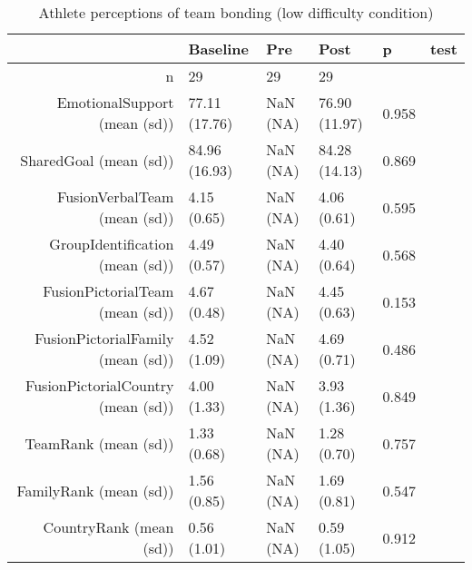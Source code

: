 \begin{table}[ht]
\centering
\begin{tabular}{rlllll}
  \hline
 & Baseline & Pre & Post & p & test \\ 
  \hline
n &    29 &  29 &    29 &  &  \\ 
  EmotionalSupport (mean (sd)) & 77.11 (17.76) & NaN (NA) & 76.90 (11.97) &  0.958 &  \\ 
  SharedGoal (mean (sd)) & 84.96 (16.93) & NaN (NA) & 84.28 (14.13) &  0.869 &  \\ 
  FusionVerbalTeam (mean (sd)) &  4.15 (0.65) & NaN (NA) &  4.06 (0.61) &  0.595 &  \\ 
  GroupIdentification (mean (sd)) &  4.49 (0.57) & NaN (NA) &  4.40 (0.64) &  0.568 &  \\ 
  FusionPictorialTeam (mean (sd)) &  4.67 (0.48) & NaN (NA) &  4.45 (0.63) &  0.153 &  \\ 
  FusionPictorialFamily (mean (sd)) &  4.52 (1.09) & NaN (NA) &  4.69 (0.71) &  0.486 &  \\ 
  FusionPictorialCountry (mean (sd)) &  4.00 (1.33) & NaN (NA) &  3.93 (1.36) &  0.849 &  \\ 
  TeamRank (mean (sd)) &  1.33 (0.68) & NaN (NA) &  1.28 (0.70) &  0.757 &  \\ 
  FamilyRank (mean (sd)) &  1.56 (0.85) & NaN (NA) &  1.69 (0.81) &  0.547 &  \\ 
  CountryRank (mean (sd)) &  0.56 (1.01) & NaN (NA) &  0.59 (1.05) &  0.912 &  \\ 
   \hline
\end{tabular}
\caption{Athlete perceptions of 
 team bonding (low difficulty condition)} 
\end{table}
